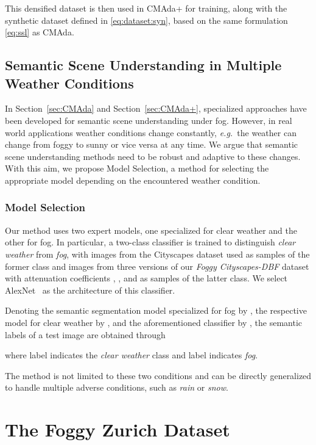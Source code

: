 \documentclass[twocolumn]{svjour3}          \smartqed  \usepackage{graphicx}
\newcommand{\eg}{\mbox{\emph{e.g.\ }}}
\begin{document}
This densified dataset is then used in CMAda+ for training, along with the synthetic dataset defined in \eqref{eq:dataset:syn}, based on the same formulation \eqref{eq:ssl} as CMAda.


\subsection{Semantic Scene Understanding in Multiple Weather Conditions} 
\label{sec:model:selection:fusion}
In Section~\ref{sec:CMAda} and Section~\ref{sec:CMAda+}, specialized approaches have been developed for semantic scene understanding under fog. However, in real world applications weather conditions change constantly, \eg{}the weather can change from foggy to sunny or vice versa at any time. We argue that semantic scene understanding methods need to be robust and adaptive to these changes. With this aim, we propose Model Selection, a method for selecting the appropriate model depending on the encountered weather condition.

\subsubsection{Model Selection} 
\label{sec:model:selection} 
Our method uses two expert models, one specialized for clear weather and the other for fog. In particular, a two-class classifier is trained to distinguish \emph{clear weather} from \emph{fog}, with images from the Cityscapes dataset used as samples of the former class and images from three versions of our \emph{Foggy Cityscapes-DBF} dataset with attenuation coefficients , , and  as samples of the latter class. We select AlexNet~\cite{alexnet} as the architecture of this classifier.

Denoting the semantic segmentation model specialized for fog by , the respective model for clear weather by , and the aforementioned classifier by , the semantic labels of a test image  are obtained through

where label  indicates the \emph{clear weather} class and label  indicates \emph{fog}.  

The method is not limited to these two conditions and can be directly generalized to handle multiple adverse conditions, such as \emph{rain} or \emph{snow}.


\section{The Foggy Zurich Dataset}
\label{sec:dataset}
\end{document}
